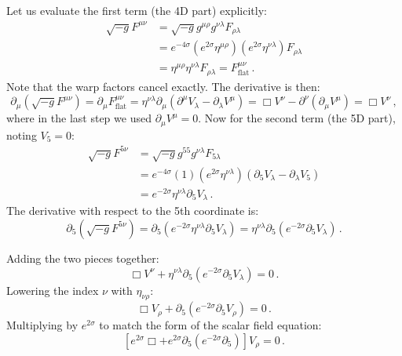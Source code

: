 \documentclass[11pt]{article}
\begin{document}
Let us evaluate the first term (the 4D part) explicitly:
\begin{align}
\sqrt{-g} F^{\mu\nu} &= \sqrt{-g} g^{\mu\rho} g^{\nu\lambda} F_{\rho\lambda} \\
&= e^{-4\sigma} (e^{2\sigma} \eta^{\mu\rho}) (e^{2\sigma} \eta^{\nu\lambda}) F_{\rho\lambda} \\
&= \eta^{\mu\rho} \eta^{\nu\lambda} F_{\rho\lambda} = F^{\mu\nu}_{\text{flat}} \, .
\end{align}
Note that the warp factors cancel exactly. The derivative is then:
\begin{equation}
\partial_\mu (\sqrt{-g} F^{\mu\nu}) = \partial_\mu F^{\mu\nu}_{\text{flat}} = \eta^{\nu\lambda} \partial_\mu (\partial^\mu V_\lambda - \partial_\lambda V^\mu) = \Box V^\nu - \partial^\nu (\partial_\mu V^\mu) = \Box V^\nu \, ,
\end{equation}
where in the last step we used $\partial_\mu V^\mu = 0$. Now for the second term (the 5D part), noting $V_5 = 0$:
\begin{align}
\sqrt{-g} F^{5\nu} &= \sqrt{-g} g^{55} g^{\nu\lambda} F_{5\lambda} \\
&= e^{-4\sigma} (1) (e^{2\sigma} \eta^{\nu\lambda}) (\partial_5 V_\lambda - \partial_\lambda V_5) \\
&= e^{-2\sigma} \eta^{\nu\lambda} \partial_5 V_\lambda \, .
\end{align}
The derivative with respect to the 5th coordinate is:
\begin{equation}
\partial_5 \left( \sqrt{-g} F^{5\nu} \right) = \partial_5 (e^{-2\sigma} \eta^{\nu\lambda} \partial_5 V_\lambda) = \eta^{\nu\lambda} \partial_5 (e^{-2\sigma} \partial_5 V_\lambda) \, .
\end{equation}

Adding the two pieces together:
\begin{equation}
\Box V^\nu + \eta^{\nu\lambda} \partial_5 (e^{-2\sigma} \partial_5 V_\lambda) = 0 \, .
\end{equation}
Lowering the index $\nu$ with $\eta_{\nu\rho}$:
\begin{equation}
\Box V_\rho + \partial_5 (e^{-2\sigma} \partial_5 V_\rho) = 0 \, .
\end{equation}
Multiplying by $e^{2\sigma}$ to match the form of the scalar field equation:
\begin{equation}
\left[ e^{2\sigma} \Box + e^{2\sigma} \partial_5 (e^{-2\sigma} \partial_5) \right] V_\rho = 0 \, .
\end{equation}
\end{document}
